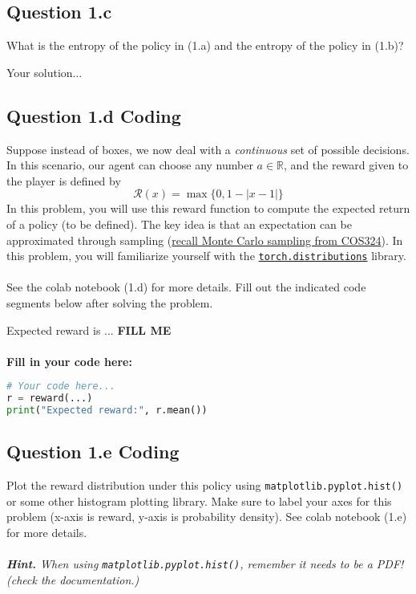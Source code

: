 \documentclass[12pt]{article}
\begin{document}
\subsection*{Question 1.c}
What is the entropy of the policy in (1.a) and the entropy of the policy in (1.b)? 

\begin{solution}
 Your solution...
\end{solution}

\subsection*{Question 1.d \textbf{Coding}}
Suppose instead of boxes, we now deal with a \textit{continuous} set of possible decisions. In this scenario, our agent can choose any number $a \in \mathbb{R}$, and the reward given to the player is defined by
$$
    \mathcal{R}(x) = \max \biggr \{ 0, 1 - |x - 1| \biggr\}
$$
In this problem, you will use this reward function to compute the expected return of a policy (to be 
defined). The key idea is that an expectation can be approximated through sampling (\href{https://princeton-introml.github.io/files/ch15.pdf}{recall Monte Carlo sampling from COS324}). In this problem, you will familiarize yourself with the \href{https://pytorch.org/docs/stable/distributions.html}{\texttt{torch.distributions}} library.
\\\\
See the colab notebook (1.d) for more details. Fill 
out the indicated code segments below after solving 
the problem.

\begin{solution}
Expected reward is ... \textbf{FILL ME}
\\\\
\textbf{Fill in your code here:}
\begin{lstlisting}[language=Python]
# Your code here...
r = reward(...)
print("Expected reward:", r.mean())
\end{lstlisting}
\end{solution}

\subsection*{Question 1.e \textbf{Coding}}
Plot the reward distribution under this policy using \texttt{matplotlib.pyplot.hist()} or some other histogram plotting library. Make sure to label your axes for this problem (x-axis is reward, y-axis is probability density). See colab notebook (1.e) for more details.
\\\\
\textit{\textbf{Hint.} When using \texttt{matplotlib.pyplot.hist()}, remember it needs to be a PDF! (check the documentation.)}
\end{document}
